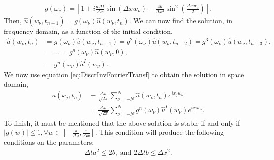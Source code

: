\begin{questions}
\begin{solution}
\begin{align}
g(\omega_{\nu}) = \left[1+i\frac{a\Delta t}{ \Delta x}\sin\left(\Delta xw_{\nu}\right)-\frac{4b}{\Delta x^2}\sin^2\left(\frac{\Delta xw_{\nu}}{2}\right)\right].
\end{align}
Then, $\hat{u}(w_{\nu}, t_{n+1}) = g(\omega_{\nu} )\hat{u}(w_{\nu}, t_n)$. We can now find the solution, in frequency domain, as a function of the initial condition.
\begin{align*}
\hat{u}(w_{\nu}, t_n) &= g(\omega_{\nu} )\hat{u}(w_{\nu}, t_{n-1})= g^2(\omega_{\nu} )\hat{u}(w_{\nu}, t_{n-2})= g^3(\omega_{\nu} )\hat{u}(w_{\nu}, t_{n-3}),\\
&= \dots = g^n(\omega_{\nu} )\hat{u}(w_{\nu}, 0),\\
&= g^n(\omega_{\nu} )\hat{u}^I(w_{\nu}).
\end{align*}
We now use equation \eqref{eq:DiscrInvFourierTransf} to obtain the solution in space domain,
\begin{align}
u(x_j,t_n)&=\frac{\Delta w}{\sqrt{2\pi}}\sum_{\nu=-N}^N \hat{u}(w_{\nu},t_n)e^{ix_jw_{\nu}}\nonumber\\
&= \frac{\Delta w}{\sqrt{2\pi}}\sum_{\nu=-N}^N g^n(\omega_{\nu} )\hat{u}^I(w_{\nu})e^{ix_jw_{\nu}}.
\end{align}
To finish, it must be mentioned that the above solution is stable if and only if $|g(w)|\leq 1, \forall w\in[-\frac{\pi}{\Delta x},\frac{\pi}{\Delta x}]$. This condition will produce the following conditions on the parameters:
\begin{align*}
\Delta t a^2\leq 2b,\text{  and  }2\Delta tb\leq\Delta x^2.
\end{align*}
\end{solution}
\end{questions}